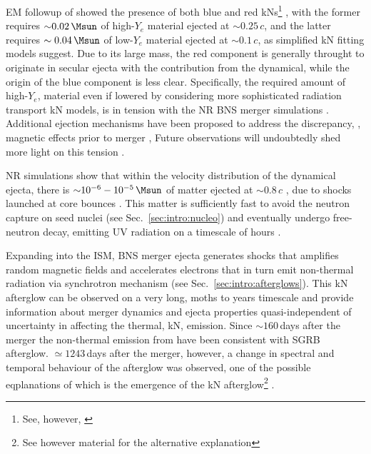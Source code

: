 \ac{EM} followup of \GW{} showed the presence of both blue and red \acp{kN}\footnote{
    See, however, \cite{Waxman:2017sqv}
} \cite{Villar:2017wcc},
with the former requires ${\sim}0.02\,\Msun$ of high-$Y_e$ material ejected at ${\sim0.25}\,c$,
and the latter requires ${\sim0.04\,\Msun}$ of low-$Y_e$ material ejected at ${\sim0.1}\,c$, 
as simplified \ac{kN} fitting models suggest. Due to its large mass, the red component is 
generally throught to originate in secular ejecta with the contribution from the dynamical, while 
the origin of the blue component is less clear. Specifically, the required amount of high-$Y_e$,
material even if lowered by considering more sophisticated radiation transport \ac{kN} models,
is in tension with the \ac{NR} \ac{BNS} merger simulations \cite{Sekiguchi:2016bjd,Siegel:2019mlp,Perego:2017wtu,Kawaguchi:2018ptg}.
Additional ejection mechanisms have been proposed to address the discrepancy, \eg, 
magnetic effects prior to merger \cite{Metzger:2018qfl,Fernandez:2018kax,Radice:2018ghv}, 
Future observations will undoubtedly shed 
more light on this tension \cite{Metzger:2018qfl}.

\ac{NR} simulations show that within the velocity distribution of the dynamical ejecta, 
there is ${\sim}10^{-6}-10^{-5}\,\Msun$ of matter ejected at ${\sim}0.8\,c$ 
\cite{Metzger:2014yda,Hotokezaka:2018gmo,Radice:2018pdn,Radice:2018ghv}, due to shocks launched at core bounces \cite{Radice:2018pdn}.
This matter is sufficiently fast to avoid the neutron capture on seed nuclei 
(see Sec.~\ref{sec:intro:nucleo}) and eventually undergo free-neutron decay, emitting 
\ac{UV} radiation on a timescale of hours \cite{Metzger:2014yda}. 

Expanding into the \ac{ISM}, \ac{BNS} merger ejecta generates shocks that amplifies 
random magnetic fields and accelerates electrons that in turn emit non-thermal radiation 
via synchrotron mechanism (see Sec.~\ref{sec:intro:afterglows}). This \ac{kN} afterglow 
can be observed on a very long, 
moths to years timescale \cite{Nakar:2011cw,Hotokezaka:2018gmo} and provide information about merger dynamics and 
ejecta properties quasi-independent of uncertainty in \rproc{} \nuc{} affecting the 
thermal, \ac{kN}, emission. 
Since ${\sim160}\,$days after the merger the non-thermal emission from \GW{} have been 
consistent with \ac{SGRB} afterglow. ${\simeq}1243\,$days after the merger, however, a 
change in spectral and temporal behaviour of the afterglow was observed, one of the 
possible eqplanations of which is the emergence of the \ac{kN} afterglow\footnote{
    See however material \cite{Troja:2021xsw} for the alternative explanation
} \cite{Hajela:2021faz}.




